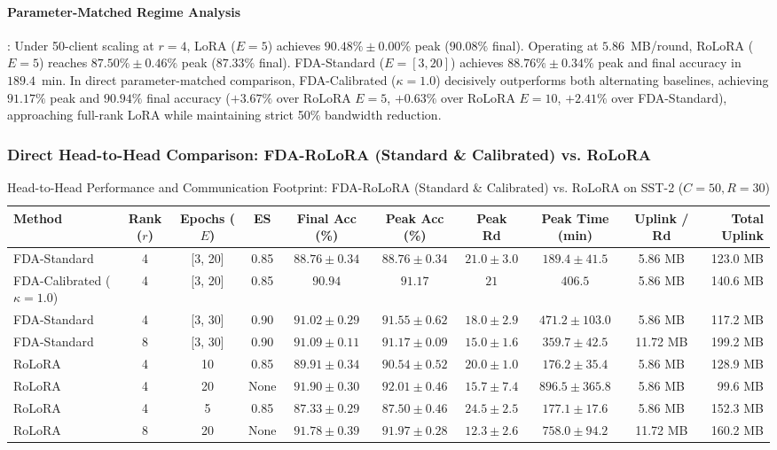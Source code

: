 \documentclass[10pt,a4paper]{article}
\begin{document}
\paragraph{Parameter-Matched Regime Analysis}:
Under 50-client scaling at $r=4$, LoRA ($E=5$) achieves $90.48\% \pm 0.00\%$ peak ($90.08\%$ final). Operating at $5.86$~MB/round, RoLoRA ($E=5$) reaches $87.50\% \pm 0.46\%$ peak ($87.33\%$ final). FDA-Standard ($E=[3,20]$) achieves $88.76\% \pm 0.34\%$ peak and final accuracy in $189.4$~min. In direct parameter-matched comparison, FDA-Calibrated ($\kappa=1.0$) decisively outperforms both alternating baselines, achieving $\mathbf{91.17\%}$ peak and $\mathbf{90.94\%}$ final accuracy ($+3.67\%$ over RoLoRA $E=5$, $+0.63\%$ over RoLoRA $E=10$, $+2.41\%$ over FDA-Standard), approaching full-rank LoRA while maintaining strict 50\% bandwidth reduction.

\subsubsection*{Direct Head-to-Head Comparison: FDA-RoLoRA (Standard \& Calibrated) vs. RoLoRA}
\begin{table}[H]
\centering
\caption{Head-to-Head Performance and Communication Footprint: FDA-RoLoRA (Standard \& Calibrated) vs. RoLoRA on SST-2 ($C=50, R=30$)}
\label{tab:direct_sst2_c50_r30}
\scriptsize
\setlength{\tabcolsep}{1.4pt}
\begin{tabular*}{\textwidth}{@{\extracolsep{\fill}}lccccccccr@{}}
\toprule
\textbf{Method} & \textbf{Rank ($r$)} & \textbf{Epochs ($E$)} & \textbf{ES} & \textbf{Final Acc (\%)} & \textbf{Peak Acc (\%)} & \textbf{Peak Rd} & \textbf{Peak Time (min)} & \textbf{Uplink / Rd} & \textbf{Total Uplink} \\
\midrule
    FDA-Standard & 4 & [3, 20] & 0.85 & $88.76 \pm 0.34$ & $88.76 \pm 0.34$ & $21.0 \pm 3.0$ & $189.4 \pm 41.5$ & 5.86 MB & 123.0 MB \\
    FDA-Calibrated ($\kappa=1.0$) & 4 & [3, 20] & 0.85 & $90.94$ & $91.17$ & $21$ & $406.5$ & 5.86 MB & 140.6 MB \\
    FDA-Standard & 4 & [3, 30] & 0.90 & $91.02 \pm 0.29$ & $91.55 \pm 0.62$ & $18.0 \pm 2.9$ & $471.2 \pm 103.0$ & 5.86 MB & 117.2 MB \\
    FDA-Standard & 8 & [3, 30] & 0.90 & $91.09 \pm 0.11$ & $91.17 \pm 0.09$ & $15.0 \pm 1.6$ & $359.7 \pm 42.5$ & 11.72 MB & 199.2 MB \\
    RoLoRA & 4 & 10 & 0.85 & $89.91 \pm 0.34$ & $90.54 \pm 0.52$ & $20.0 \pm 1.0$ & $176.2 \pm 35.4$ & 5.86 MB & 128.9 MB \\
    RoLoRA & 4 & 20 & None & $91.90 \pm 0.30$ & $92.01 \pm 0.46$ & $15.7 \pm 7.4$ & $896.5 \pm 365.8$ & 5.86 MB & 99.6 MB \\
    RoLoRA & 4 & 5 & 0.85 & $87.33 \pm 0.29$ & $87.50 \pm 0.46$ & $24.5 \pm 2.5$ & $177.1 \pm 17.6$ & 5.86 MB & 152.3 MB \\
    RoLoRA & 8 & 20 & None & $91.78 \pm 0.39$ & $91.97 \pm 0.28$ & $12.3 \pm 2.6$ & $758.0 \pm 94.2$ & 11.72 MB & 160.2 MB \\
\bottomrule
\end{tabular*}
\end{table}
\end{document}
